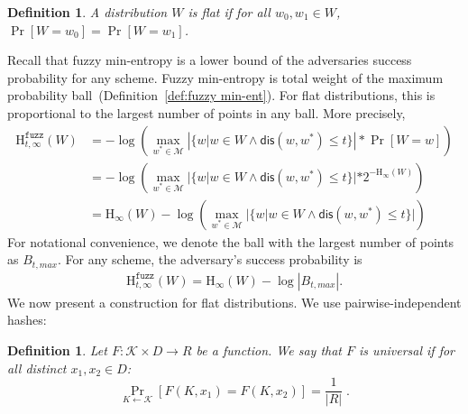 \documentclass[11pt]{article}
\newcommand{\defref}[1]{\mbox{Definition~\ref{#1}}}
\newcommand{\dis}{\ensuremath{\mathsf{dis}}}
\newcommand{\Hoo}{\mathrm{H}_\infty}
\newcommand{\Hfuzz}{\mathrm{H}^{\mathtt{fuzz}}_{t,\infty}}
\newtheorem{definition}[theorem]{Definition}
\begin{document}
\begin{definition}
A distribution $W$ is \emph{flat} if for all $w_0, w_1 \in W$, $\Pr[W=w_0] = \Pr[W=w_1]$.  
\end{definition}

Recall that fuzzy min-entropy is a lower bound of the adversaries success probability for any scheme.  Fuzzy min-entropy is total weight of the maximum probability ball~(\defref{def:fuzzy min-ent}).  For flat distributions, this is proportional to the largest number of points in any ball.  More precisely, 
\begin{align*}
\Hfuzz(W) &= -\log \left(\max_{w^* \in \mathcal{M}} \left| \{w | w\in W \wedge \dis(w, w^*)\le t\} \right|* \Pr[W=w]\right) \\
&= -\log\left( \max_{w^* \in \mathcal{M}} |\{w | w\in W \wedge \dis(w, w^*)\le t\}| *2^{-\Hoo(W)}\right) \\
&=\Hoo(W) -\log\left( \max_{w^* \in \mathcal{M}}| \{w | w\in W \wedge \dis(w, w^*)\le t\} |\right)
\end{align*}
For notational convenience, we denote the ball with the largest number of points as $B_{t, max}$.  For any scheme, the adversary's success probability is 
\begin{align}
\Hfuzz(W) = \Hoo(W) -\log |B_{t, max}|.\label{eq:fuzz for flat}
\end{align}
%
%
We now present a construction for flat distributions.  We use pairwise-independent hashes:

\begin{definition}
Let $F : \mathcal{K} \times D \to R$ be a function.  We say that $F$ is \emph{universal} if for all distinct $x_1, x_2 \in D$:
\[
 \Pr_{K \leftarrow \mathcal{K}}[F(K, x_1) = F(K, x_2)] = \frac{1}{|R|} \;.
\]
\end{definition}
\end{document}
